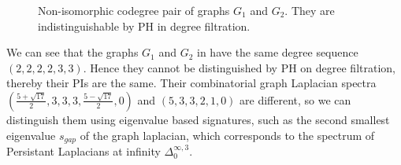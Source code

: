 \documentclass{article}
\begin{document}
\begin{figure}[h]
    \centering
{}
    \caption{Non-isomorphic codegree pair of graphs $G_1$ and $G_2$. They are indistinguishable by PH in degree filtration.}
    \label{fig:eigenval_dist}
\end{figure}
We can see that the graphs $G_1$ and $G_2$ in  have the same degree sequence $(2,2,2,2,3,3)$. Hence they cannot be distinguished by PH on degree filtration, thereby their PIs are the same. Their combinatorial graph Laplacian spectra $\left(\frac{5+\sqrt{17}}{2},3,3,3,\frac{5-\sqrt{17}}{2},0\right)$ and $(5,3,3,2,1,0)$ are different, so we can distinguish them using eigenvalue based signatures, such as the second smallest eigenvalue $s_{gap}$ of the graph laplacian, which corresponds to the spectrum of Persistant Laplacians at infinity $\Delta^{\infty,3}_0$.
\end{document}
